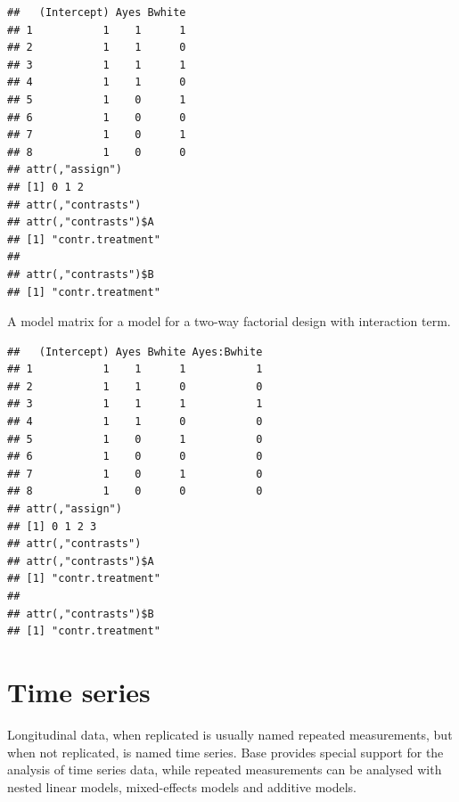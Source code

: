 \documentclass[krantz2]{krantz}\usepackage{knitr}%
\begin{document}
\begin{explainbox}
\begin{knitrout}\footnotesize
{}\color{fgcolor}\begin{kframe}
\begin{alltt}
\hlstd{(}\hlopt{~}  \hlopt{+} 
\end{alltt}
\begin{verbatim}
##   (Intercept) Ayes Bwhite
## 1           1    1      1
## 2           1    1      0
## 3           1    1      1
## 4           1    1      0
## 5           1    0      1
## 6           1    0      0
## 7           1    0      1
## 8           1    0      0
## attr(,"assign")
## [1] 0 1 2
## attr(,"contrasts")
## attr(,"contrasts")$A
## [1] "contr.treatment"
## 
## attr(,"contrasts")$B
## [1] "contr.treatment"
\end{verbatim}
\end{kframe}
\end{knitrout}

A model matrix for a model for a two-way factorial design with interaction term.

\begin{knitrout}\footnotesize
{}\color{fgcolor}\begin{kframe}
\begin{alltt}
\hlstd{(}\hlopt{~}  \hlopt{*} 
\end{alltt}
\begin{verbatim}
##   (Intercept) Ayes Bwhite Ayes:Bwhite
## 1           1    1      1           1
## 2           1    1      0           0
## 3           1    1      1           1
## 4           1    1      0           0
## 5           1    0      1           0
## 6           1    0      0           0
## 7           1    0      1           0
## 8           1    0      0           0
## attr(,"assign")
## [1] 0 1 2 3
## attr(,"contrasts")
## attr(,"contrasts")$A
## [1] "contr.treatment"
## 
## attr(,"contrasts")$B
## [1] "contr.treatment"
\end{verbatim}
\end{kframe}
\end{knitrout}

\end{explainbox}

\section{Time series}\label{sec:stat:time:series}
Longitudinal data, when replicated is usually named repeated measurements, but when not replicated, is named time series.
Base \Rlang provides special support for the analysis of time series data, while repeated measurements can be analysed with nested linear models, mixed-effects models and additive models.
\end{document}
